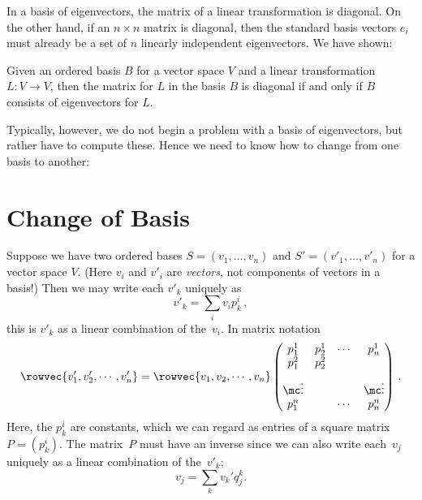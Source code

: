 In a basis of eigenvectors, the matrix of a linear transformation is diagonal.  On the other hand, if an $n \times n$ matrix is diagonal, then the standard basis vectors $e_i$ must already be a set of $n$ linearly independent eigenvectors.  We have shown:

\begin{theorem}
Given an ordered basis $B$ for a vector space $V$ and a linear transformation $L \colon V\rightarrow V$, then the matrix for $L$ in the basis $B$ is diagonal if and only if $B$ consists of eigenvectors for $L$.
\end{theorem}



Typically, however, we do not begin a problem with a basis of eigenvectors, but rather have to compute these. Hence we need to know how to change from one basis to another:

\section{Change of Basis}

Suppose we have two  ordered bases $S=(v_1, \ldots, v_n )$ and 
$S'=(v'_1, \ldots, v'_n )$ for a vector space $V$. (Here $v_i$ and $v'_i$ are {\itshape vectors}, not components of vectors in a basis!) 
Then we may write each $v'_k$ uniquely as 
\[
v'_k = \sum_i v_ip^i_k\, ,
\]
this is $v'_k$ as a linear combination of the~$v_i$. 
In  matrix notation
\[ 
\rowvec{v'_1 , v'_2 , \cdots , v'_n} = \rowvec{v_1 , v_2 , \cdots , v_n}
\begin{pmatrix}p^1_1&p^1_2&\cdots &p^1_n\\ p^2_1 & p^2_2 && \\[2mm]
                                              \mc\vdots &&&\mc\vdots\\ p^n_1 &&\cdots & p^n_n\end{pmatrix}\, .
\]
Here, the $p^i_k$ are constants, which we can regard as entries of  a square matrix~$P=(p^i_k)$.  The matrix~$P$ must have an inverse since we can also write each~$v_j$ uniquely as a linear combination of the~$v'_k$;
\[
v_j = \sum_k v_k' q^k_j.
\]

